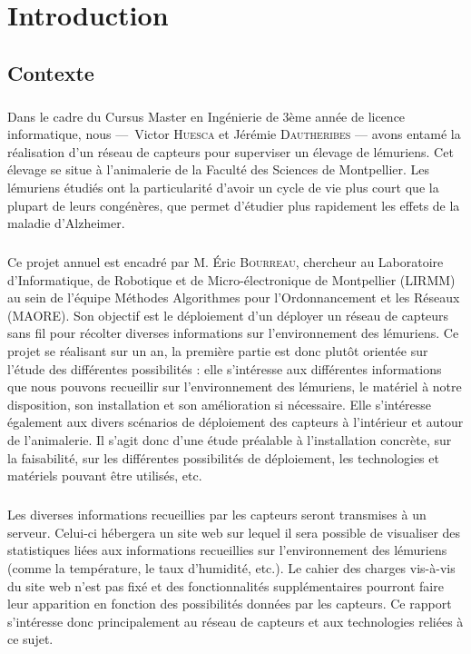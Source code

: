 \chapter*{Introduction}
\label{chap:introduction}

\setlength{\parskip}{0.7pt}


\section*{Contexte}
    \paragraph{}Dans le cadre du Cursus Master en Ingénierie de 3ème année de licence informatique, nous ---~Victor \textsc{Huesca} et Jérémie \textsc{Dautheribes} --- avons entamé la réalisation d'un réseau de capteurs pour superviser un élevage de lémuriens. Cet élevage se situe à l'animalerie de la Faculté des Sciences de Montpellier. Les lémuriens étudiés ont la particularité d'avoir un cycle de vie plus court que la plupart de leurs congénères, que permet d'étudier plus rapidement les effets de la maladie d'Alzheimer. 
    
    \paragraph{}Ce projet annuel est encadré par M. Éric \textsc{Bourreau}, chercheur au Laboratoire d'Informatique, de Robotique et de Micro-électronique de Montpellier (LIRMM) au sein de l'équipe Méthodes Algorithmes pour l'Ordonnancement et les Réseaux (MAORE). Son objectif est le déploiement d'un déployer un réseau de capteurs sans fil pour récolter diverses informations sur l'environnement des lémuriens. Ce projet se réalisant sur un an, la première partie est donc plutôt orientée sur l'étude des différentes possibilités : elle s'intéresse aux différentes informations que nous pouvons recueillir sur l'environnement des lémuriens, le matériel à notre disposition, son installation et son amélioration si nécessaire. Elle s'intéresse également aux divers scénarios de déploiement des capteurs à l'intérieur et autour de l'animalerie. Il s'agit donc d'une étude préalable à l'installation concrète, sur la faisabilité, sur les différentes possibilités de déploiement, les technologies et matériels pouvant être utilisés, etc. 
    
    \paragraph{}Les diverses informations recueillies par les capteurs seront transmises à un serveur. Celui-ci hébergera un site web sur lequel il sera possible de visualiser des statistiques liées aux informations recueillies sur l'environnement des lémuriens (comme la température, le taux d'humidité, etc.). Le cahier des charges vis-à-vis du site web n'est pas fixé et des fonctionnalités supplémentaires pourront faire leur apparition en fonction des possibilités données par les capteurs. Ce rapport s'intéresse donc principalement au réseau de capteurs et aux technologies reliées à ce sujet. 

